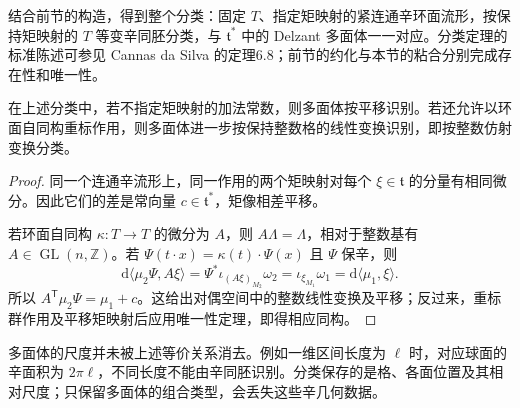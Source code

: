 结合前节的构造，得到整个分类：固定 \(T\)、指定矩映射的紧连通辛环面流形，按保持矩映射的 \(T\) 等变辛同胚分类，与 \(\mathfrak t^*\) 中的 Delzant 多面体一一对应。分类定理的标准陈述可参见 Cannas da Silva 的定理6.8；前节的约化与本节的粘合分别完成存在性和唯一性。\cite[第6.4节，第169--174页]{Cannas2006Symplectic}

\begin{proposition}\label{g4:prop:1204:translation-lattice-freedom}
	在上述分类中，若不指定矩映射的加法常数，则多面体按平移识别。若还允许以环面自同构重标作用，则多面体进一步按保持整数格的线性变换识别，即按整数仿射变换分类。
\end{proposition}
\begin{proof}
	同一个连通辛流形上，同一作用的两个矩映射对每个 \(\xi\in\mathfrak t\) 的分量有相同微分。因此它们的差是常向量 \(c\in\mathfrak t^*\)，矩像相差平移。

	若环面自同构 \(\kappa:T\to T\) 的微分为 \(A\)，则 \(A\Lambda=\Lambda\)，相对于整数基有 \(A\in\operatorname{GL}(n,\mathbb Z)\)。若 \(\Psi(t\cdot x)=\kappa(t)\cdot\Psi(x)\) 且 \(\Psi\) 保辛，则
	\[
		\mathrm{d}\langle\mu_2\Psi,A\xi\rangle
		=\Psi^*\iota_{(A\xi)_{M_2}}\omega_2
		=\iota_{\xi_{M_1}}\omega_1
		=\mathrm{d}\langle\mu_1,\xi\rangle.
	\]
	所以 \(A^{\mathsf T}\mu_2\Psi=\mu_1+c\)。这给出对偶空间中的整数线性变换及平移；反过来，重标群作用及平移矩映射后应用唯一性定理，即得相应同构。
\end{proof}

多面体的尺度并未被上述等价关系消去。例如一维区间长度为 \(\ell\) 时，对应球面的辛面积为 \(2\pi\ell\)，不同长度不能由辛同胚识别。分类保存的是格、各面位置及其相对尺度；只保留多面体的组合类型，会丢失这些辛几何数据。
